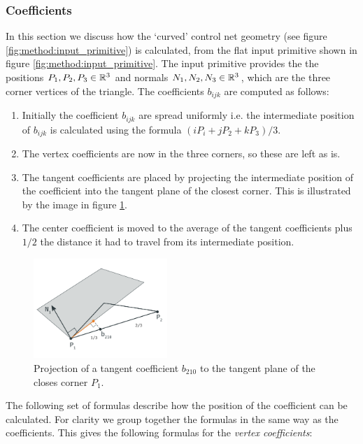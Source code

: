 \subsubsection{Coefficients} \label{sss:control_point_construction}
In this section we discuss how the `curved' control net geometry (see figure \ref{fig:method:input_primitive}) is calculated, from the flat input primitive shown in figure \ref{fig:method:input_primitive}. The input primitive provides the the positions $P_1, P_2, P_3 \in \mathbb{R}^3$ and normals $N_1, N_2, N_3 \in \mathbb{R}^3$, which are the three corner vertices of the triangle. The coefficients $b_{ijk}$ are computed as follows:
%
\begin{enumerate}
	\item Initially the coefficient $b_{ijk}$ are spread uniformly i.e. the intermediate position of $b_{ijk}$ is calculated using the formula $(i P_i + j P_2 + kP_3) / 3$.
	\item The vertex coefficients are now in the three corners, so these are left as is.
	\item The tangent coefficients are placed by projecting the intermediate position of the coefficient into the tangent plane of the closest corner. This is illustrated by the image in figure \ref{fig:method:geometry_tangent_projection.png}.
	\item The center coefficient is moved to the average of the tangent coefficients plus $1/2$ the distance it had to travel from its intermediate position.
\end{enumerate}
%
\begin{figure}
	\centering
	\includegraphics[width=0.45\textwidth]{./content/img/method/geometry_tangent_projection.png}
	\caption{Projection of a tangent coefficient $b_{210}$ to the tangent plane of the closes corner $P_1$.}
	\label{fig:method:geometry_tangent_projection.png}
\end{figure}
%
The following set of formulas describe how the position of the coefficient can be calculated. For clarity we group together the formulas in the same way as the coefficients. This gives the following formulas for the \textit{vertex coefficients}:

